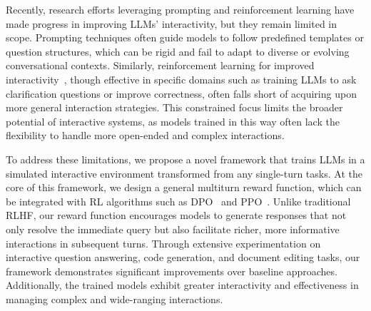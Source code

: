 Recently, research efforts leveraging prompting and reinforcement learning have made progress in improving LLMs' interactivity, but they remain limited in scope. Prompting techniques \citep{ask_more_informative_questions, clarify_when_necessary, clarifygpt, rephrase_and_respond} often guide models to follow predefined templates or question structures, which can be rigid and fail to adapt to diverse or evolving conversational contexts. Similarly, reinforcement learning for improved interactivity~\citep{baize, clarify_question_for_retrieval, learn_to_clarify, star_gate, self_correct}, though effective in specific domains such as training LLMs to ask clarification questions or improve correctness, often falls short of acquiring upon more general interaction strategies. This constrained focus limits the broader potential of interactive systems, as models trained in this way often lack the flexibility to handle more open-ended and complex interactions. 

To address these limitations, we propose a novel framework that trains LLMs in a simulated interactive environment transformed from any single-turn tasks. At the core of this framework, we design a general multiturn reward function, which can be integrated with RL algorithms such as DPO~\citep{dpo} and PPO~\citep{ppo}. Unlike traditional RLHF, our reward function encourages models to generate responses that not only resolve the immediate query but also facilitate richer, more informative interactions in subsequent turns. Through extensive experimentation on interactive question answering, code generation, and document editing tasks, our framework demonstrates significant improvements over baseline approaches. Additionally, the trained models exhibit greater interactivity and effectiveness in managing complex and wide-ranging interactions.

